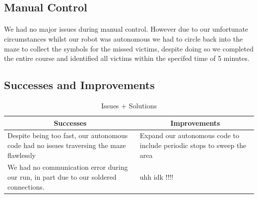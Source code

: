 \documentclass[12pt, a4paper]{article}
\newcommand{\heading}[1]{\multicolumn{1}{c}{#1}}
\begin{document}
          \subsection{Manual Control}
            \paragraph{}
              We had no major issues during manual control. However due to our unfortunate circumstances whilst our robot was autonomous we had to circle back into the maze to collect the symbols for the missed victims, despite doing so we completed the entire course and identified all victims within the specifed time of 5 minutes.

          \subsection{Successes and Improvements}
            \begin{table}[htbp]
              \centering
                \begin{tabularx}{\textwidth}{bb}
                  \hline
                  \heading{Successes} & \heading{Improvements} \\ \hline \hline
                    Despite being too fast, our autonomous code had no issues traversing the maze flawlessly & Expand our autonomous code to include periodic stops to sweep the area \\ \hline
                    We had no communication error during our run, in part due to our soldered connections. & uhh idk !!!! \\ \hline
                \end{tabularx}
              \caption{Issues + Solutions}
            \end{table}
\end{document}
